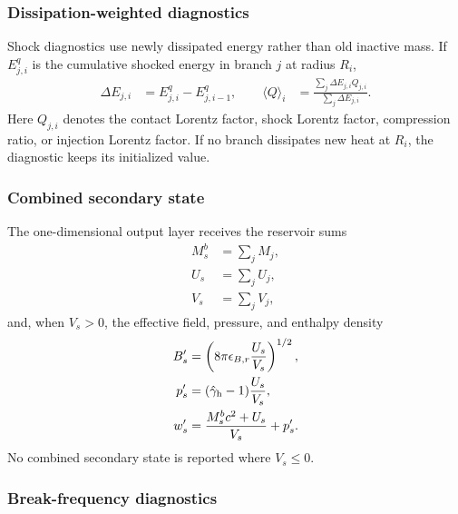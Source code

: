 \documentclass[twocolumn]{aastex702}
\begin{document}
\subsubsection{Dissipation-weighted diagnostics}

Shock diagnostics use newly dissipated energy rather than old inactive mass.  If
\(E^q_{j,i}\) is the cumulative shocked energy in branch \(j\) at radius \(R_i\),
\begin{equation}
\begin{aligned}
\Delta E_{j,i}&=E^q_{j,i}-E^q_{j,i-1},
\qquad
\langle Q\rangle_i&=
\frac{\sum_j \Delta E_{j,i}Q_{j,i}}
{\sum_j \Delta E_{j,i}}.
\end{aligned}
\end{equation}
Here \(Q_{j,i}\) denotes the contact Lorentz factor, shock Lorentz factor,
compression ratio, or injection Lorentz factor.  If no branch dissipates new
heat at \(R_i\), the diagnostic keeps its initialized value.

\subsubsection{Combined secondary state}

The one-dimensional output layer receives the reservoir sums
\begin{equation}
\begin{aligned}
M_s^b&=\sum_j M_j,\\
U_s&=\sum_j U_j,\\
V_s&=\sum_j V_j,
\end{aligned}
\end{equation}
and, when \(V_s>0\), the effective field, pressure, and enthalpy density
\begin{equation}
\begin{aligned}
B'_s&=\left(8\pi\epsilon_{B,r}\frac{U_s}{V_s}\right)^{1/2},\\
p'_s&=(\hat\gamma_{\rm h}-1)\frac{U_s}{V_s},\\
w'_s&=\frac{M_s^b c^2+U_s}{V_s}+p'_s .
\end{aligned}
\end{equation}
No combined secondary state is reported where \(V_s\le0\).

\subsubsection{Break-frequency diagnostics}
\end{document}
